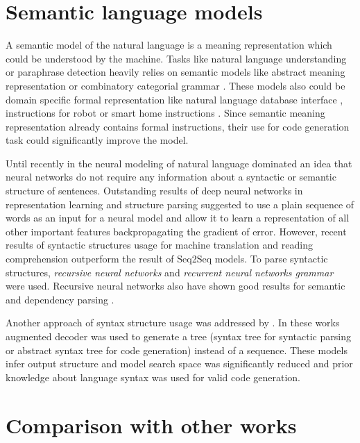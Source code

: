 \section{Semantic language models}
A semantic model of the natural language is a meaning representation which could be understood by the machine. Tasks like natural language understanding or paraphrase detection heavily relies on semantic models like abstract meaning representation \parencite{banarescu2013abstract} or combinatory categorial grammar \parencite{Clark2007}. These models also could be domain specific formal representation like natural language database interface \parencite{Zettlemoyer2012, berant2013semantic}, instructions for robot \parencite{artzi2013weakly} or smart home instructions \parencite{quirk2015language}. Since semantic meaning representation already contains formal instructions, their use for code generation task could significantly improve the model. 

Until recently in the neural modeling of natural language dominated an idea that neural networks do not require any information about a syntactic or semantic structure of sentences. Outstanding results of deep neural networks in representation learning and structure parsing suggested to use a plain sequence of words as an input for a neural model and allow it to learn a representation of all other important features backpropagating the gradient of error. However, recent results of syntactic structures usage for machine translation \parencite{Chen2017} and reading comprehension \parencite{xie2017constituent} outperform the result of Seq2Seq models. To parse syntactic structures, \emph{recursive neural networks} \parencite{Goller, socher2011parsing} and \emph{recurrent neural networks grammar} \parencite{Dyer2016} were used. Recursive neural networks also have shown good results for semantic \parencite{Tai2015} and dependency parsing \parencite{Zhu2015}. 

Another approach of syntax structure usage was addressed by \cite{Dong2016, Yin2017, Rabinovich2017}. In these works augmented decoder was used to generate a tree (syntax tree for syntactic parsing or abstract syntax tree for code generation) instead of a sequence. These models infer output structure and model search space was significantly reduced and prior knowledge about language syntax was used for valid code generation.

\section{Comparison with other works}

